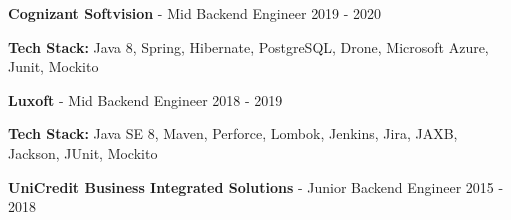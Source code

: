 \documentclass[11pt]{article}
\newcommand{\betteruline}[1]{
    \uline{#1}
}
\newcommand{\sectiontitle}[1]{
    \begingroup
        \titlebold
        \betteruline{\Large\uppercase{#1}  }
        \vspace{1.7mm}
    \endgroup
}
\newcommand{\sectioncontent}[1]{
    \begingroup
        \begin{FlushLeft}
        \vspace{-3mm}
        \sffamily\small#1
        \end{FlushLeft}
    \endgroup
    \vspace{2mm}
}
\newcommand{\job}[3]{
    \begingroup
        \textbf{\small#1} - \small#2
        \hfill\color{black!70}\small{#3}
    \endgroup
}
\newcommand{\project}[2]{
    \begingroup
        \textbf{\small#1}
        \hfill\color{black!70}\small{#2}
    \endgroup
}
\newcommand{\spacevv}{
    \vspace{2mm}
}
\begin{document}
\begin{paracol}{2}
{      \job{Cognizant Softvision}{Mid Backend Engineer}{2019 - 2020}
      \item \textbf{Tech Stack:} Java 8, Spring, Hibernate, PostgreSQL, Drone, Microsoft Azure, Junit, Mockito
      \spacevv
      \spacevv
      \spacevv

      \job{Luxoft}{Mid Backend Engineer}{2018 - 2019}
      \item \textbf{Tech Stack:} Java SE 8, Maven, Perforce, Lombok, Jenkins, Jira, JAXB, Jackson, JUnit, Mockito
      \spacevv
      \spacevv
      \spacevv

      \job{UniCredit Business Integrated Solutions}{Junior Backend Engineer}{2015 - 2018}
    }



       



\end{paracol}
\end{document}

